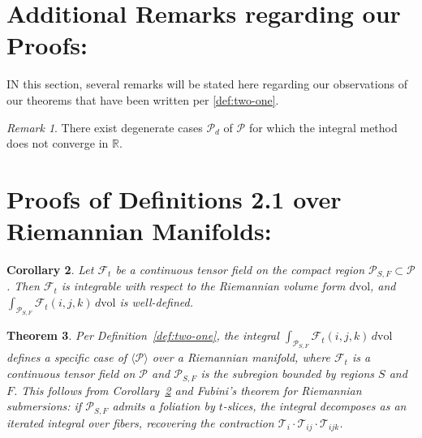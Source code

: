 \documentclass[10pt]{article}
\theoremstyle{plain}
\newtheorem{theorem}{Theorem}[section]
\newtheorem{corollary}[theorem]{Corollary}
\theoremstyle{definition}
\theoremstyle{remark}
\newtheorem{remark}[theorem]{Remark}
\begin{document}
\section{Additional Remarks regarding our Proofs:}

\lettrine[lines=1, lhang=0.1, loversize=0.2]{I}N this section, several remarks will be stated here regarding our observations of our theorems that have been written per \ref{def:two-one}.

\begin{remark}
\label{remark:one}
  There exist degenerate cases $\mathcal{P}_d$ of $\mathcal{P}$ for which the integral method does not converge in $\mathbb{R}$.
\end{remark}

\section{Proofs of Definitions 2.1 over Riemannian Manifolds:}

\begin{corollary}
\label{cor:integrability}
  Let $\mathcal{F}_t$ be a continuous tensor field on the compact region $\mathcal{P}_{S,F} \subset \mathcal{P}$. Then $\mathcal{F}_t$ is integrable with respect to the Riemannian volume form $d\mathrm{vol}$, and $\int_{\mathcal{P}_{S,F}} \mathcal{F}_t(i,j,k)\,d\mathrm{vol}$ is well-defined.
\end{corollary}

\begin{theorem}
\label{theo:one}
  Per Definition~\ref{def:two-one}, the integral $\int_{\mathcal{P}_{S,F}} \mathcal{F}_t(i, j, k)\,d\mathrm{vol}$ defines a specific case of $\langle \mathcal{P} \rangle$ over a Riemannian manifold, where $\mathcal{F}_t$ is a continuous tensor field on $\mathcal{P}$ and $\mathcal{P}_{S,F}$ is the subregion bounded by regions $S$ and $F$. This follows from Corollary~\ref{cor:integrability} and Fubini's theorem for Riemannian submersions: if $\mathcal{P}_{S,F}$ admits a foliation by $t$-slices, the integral decomposes as an iterated integral over fibers, recovering the contraction $\mathcal{T}_i \cdot \mathcal{T}_{ij} \cdot \mathcal{T}_{ijk}$.
\end{theorem}
\end{document}
